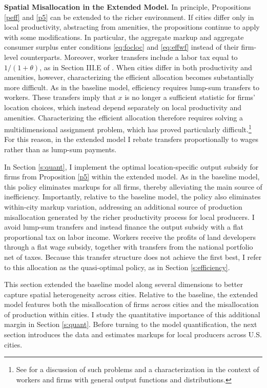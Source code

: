 \textbf{Spatial Misallocation in the Extended Model.} In principle, Propositions \ref{peff} and \ref{p5} can be extended to the richer environment. If cities differ only in local productivity, abstracting from amenities, the propositions continue to apply with some modifications. In particular, the aggregate markup and aggregate consumer surplus enter conditions \eqref{eq:focloc} and \eqref{eq:effwf} instead of their firm-level counterparts. Moreover, worker transfers include a labor tax equal to $1/(1+\theta)$, as in Section III.E of \textcite{Fajgelbaum&Gaubert20}. When cities differ in both productivity and amenities, however, characterizing the efficient allocation becomes substantially more difficult. As in the baseline model, efficiency requires lump-sum transfers to workers. These transfers imply that $x$ is no longer a sufficient statistic for firms’ location choices, which instead depend separately on local productivity and amenities. Characterizing the efficient allocation therefore requires solving a multidimensional assignment problem, which has proved particularly difficult.\footnote{See \textcite{boerma2025multisorting} for a discussion of such problems and a characterization in the context of workers and firms with general output functions and distributions.} For this reason, in the extended model I rebate transfers proportionally to wages rather than as lump-sum payments.

In Section \ref{s:quant}, I implement the optimal location-specific output subsidy for firms from Proposition \ref{p5} within the extended model. As in the baseline model, this policy eliminates markups for all firms, thereby alleviating the main source of inefficiency. Importantly, relative to the baseline model, the policy also eliminates within-city markup variation, addressing an additional source of production misallocation generated by the richer productivity process for local producers. I avoid lump-sum transfers and instead finance the output subsidy with a flat proportional tax on labor income. Workers receive the profits of land developers through a flat wage subsidy, together with transfers from the national portfolio net of taxes. Because this transfer structure does not achieve the first best, I refer to this allocation as the quasi-optimal policy, as in Section \ref{s:efficiency}.

This section extended the baseline model along several dimensions to better capture spatial heterogeneity across cities. Relative to the baseline, the extended model features both the misallocation of firms across cities and the misallocation of production within cities. I study the quantitative importance of this additional margin in Section \ref{s:quant}. Before turning to the model quantification, the next section introduces the data and estimates markups for local producers across U.S. cities.

